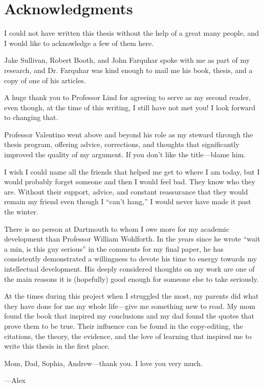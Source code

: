 \chapter*{Acknowledgments}
\begin{noparindent}
\SingleSpacing

I could not have written this thesis without the help of a great many people, and I would like to acknowledge a few of them here.

Jake Sullivan, Robert Booth, and John Farquhar spoke with me as part of my research, and Dr. Farquhar was kind enough to mail me his book, thesis, and a copy of one of his articles.

A huge thank you to Professor Lind for agreeing to serve as my second reader, even though, at the time of this writing, I still have not met you! I look forward to changing that.

Professor Valentino went above and beyond his role as my steward through the thesis program, offering advice, corrections, and thoughts that significantly improved the quality of my argument. If you don't like the title---blame him.

I wish I could name all the friends that helped me get to where I am today, but I would probably forget someone and then I would feel bad. They know who they are. Without their support, advice, and constant reassurance that they would remain my friend even though I ``can't hang,'' I would never have made it past the winter.

There is no person at Dartmouth to whom I owe more for my academic development than Professor William Wohlforth. In the years since he wrote ``wait a min, is this guy serious'' in the comments for my final paper, he has consistently demonstrated a willingness to devote his time to energy towards my intellectual development. His deeply considered thoughts on my work are one of the main reasons it is (hopefully) good enough for someone else to take seriously.

At the times during this project when I struggled the most, my parents did what they have done for me my whole life---give me something new to read. My mom found the book that inspired my conclusions and my dad found the quotes that prove them to be true. Their influence can be found in the copy-editing, the citations, the theory, the evidence, and the love of learning that inspired me to write this thesis in the first place.

Mom, Dad, Sophia, Andrew---thank you. I love you very much.

---Alex

\end{noparindent}
\newpage

